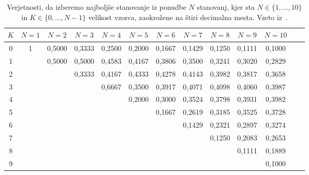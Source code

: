 \documentclass[a4paper, 12pt, titlepage]{article}
\begin{document}
\begin{table}[!ht]
    \centering
    \small
    \begin{tabular}[h]{|c|c|c|c|c|c|c|c|c|c|c|c|c|}
        \hline
        $K$ & $N=1$ & $N=2$ & $N=3$ & $N=4$ & $N=5$ & $N=6$ & $N=7$ & $N=8$ & $N=9$ & $N=10$ \\
        \hline
        0 & \cellcolor{blue!10}1 & \cellcolor{blue!10}0,5000 & 0,3333 & 0,2500 & 0,2000 & 0,1667 & 0,1429 & 0,1250 & 0,1111 & 0,1000 \\
        \hline
        1 & & \cellcolor{blue!10}0,5000 & \cellcolor{blue!10}0,5000 & \cellcolor{blue!10}0,4583 & 0,4167 & 0,3806 & 0,3500 & 0,3241 & 0,3020 & 0,2829 \\
        \hline
        2 & & & 0,3333 & 0,4167 & \cellcolor{blue!10}0,4333 & \cellcolor{blue!10}0,4278 & \cellcolor{blue!10}0,4143 & 0,3982 & 0,3817 & 0,3658 \\
        \hline
        3 & & & & 0,6667 & 0,3500 & 0,3917 & 0,4071 & \cellcolor{blue!10}0,4098 & \cellcolor{blue!10}0,4060 & \cellcolor{blue!10}0,3987 \\
        \hline
        4 & & & & & 0,2000 & 0,3000 & 0,3524 & 0,3798 & 0,3931 & 0,3982 \\
        \hline
        5 & & & & & & 0,1667 & 0,2619 & 0,3185 & 0,3525 & 0,3728 \\
        \hline
        6 & & & & & & & 0,1429 & 0,2321 & 0,2897 & 0,3274 \\
        \hline
        7 & & & & & & & & 0,1250 & 0,2083 & 0,2653 \\
        \hline
        8 & & & & & & & & & 0,1111 & 0,1889 \\
        \hline
        9 & & & & & & & & & & 0,1000 \\
        \hline
    \end{tabular}
    \caption{Verjetnosti, da izberemo najboljše stanovanje iz ponudbe $N$ stanovanj, kjer sta $N \in \{1,\ldots,10\}$ in $K \in \{0,\ldots,N-1\}$ velikost vzorca, zaokrožene na štiri decimalna mesta. Vzeto iz~\cite{secretary_puzzle}.}
    \label{tabela_z_verjetnostmi}
\end{table}
\end{document}
